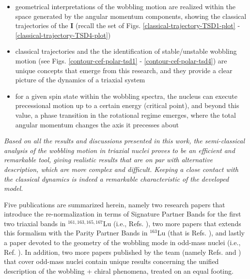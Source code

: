 \begin{itemize}
    \item geometrical interpretations of the wobbling motion are realized within the space generated by the angular momentum components, showing the classical trajectories of the $\mathbf{I}$ (recall the set of Figs. \ref{classical-trajectory-TSD1-plot} - \ref{classical-trajectory-TSD4-plot})
    \item classical trajectories and the the identification of stable/unstable wobbling motion (see Figs. \ref{contour-cef-polar-tsd1} - \ref{contour-cef-polar-tsd4}) are unique concepts that emerge from this research, and they provide a clear picture of the dynamics of a triaxial system
    \item for a given spin state within the wobbling spectra, the nucleus can execute precessional motion up to a certain energy (critical point), and beyond this value, a phase transition in the rotational regime emerges, where the total angular momentum changes the axis it precesses about
\end{itemize}

\emph{Based on all the results and discussions presented in this work, the semi-classical analysis of the wobbling motion in triaxial nuclei proves to be an efficient and remarkable tool, giving realistic results that are on par with alternative description, which are more complex and difficult. Keeping a close contact with the classical dynamics is indeed a remarkable characteristic of the developed model.}

Five publications are summarized herein, namely two research papers that introduce the re-normalization in terms of Signature Partner Bands for the first two triaxial bands in $^{161,163,165,167}$Lu (i.e., Refs. \cite{raduta2020approach,raduta2020towards}), two more papers that extends this formalism with the Parity Partner Bands in $^{163}$Lu (that is Refs. \cite{poenaru2021parity,poenaru2021extensive1}), and lastly a paper devoted to the geometry of the wobbling mode in odd-mass nuclei (i.e., Ref. \cite{poenaru2021extensive2}). In addition, two more papers published by the team (namely Refs. \cite{raduta2020new} and \cite{raduta2022simultaneous}) that cover odd-mass nuclei contain unique results concerning the unified description of the wobbling + chiral phenomena, treated on an equal footing.